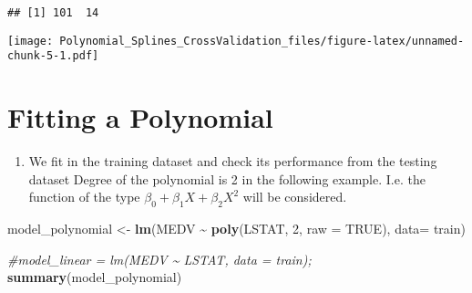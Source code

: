 \documentclass[
]{article}
\newenvironment{Shaded}{\begin{snugshade}}{\end{snugshade}}
\newcommand{\AttributeTok}[1]{\textcolor[rgb]{0.13,0.29,0.53}{#1}}
\newcommand{\CommentTok}[1]{\textcolor[rgb]{0.56,0.35,0.01}{\textit{#1}}}
\newcommand{\ConstantTok}[1]{\textcolor[rgb]{0.56,0.35,0.01}{#1}}
\newcommand{\DecValTok}[1]{\textcolor[rgb]{0.00,0.00,0.81}{#1}}
\newcommand{\FloatTok}[1]{\textcolor[rgb]{0.00,0.00,0.81}{#1}}
\newcommand{\FunctionTok}[1]{\textcolor[rgb]{0.13,0.29,0.53}{\textbf{#1}}}
\newcommand{\NormalTok}[1]{#1}
\newcommand{\OtherTok}[1]{\textcolor[rgb]{0.56,0.35,0.01}{#1}}
\newcommand{\SpecialCharTok}[1]{\textcolor[rgb]{0.81,0.36,0.00}{\textbf{#1}}}
\newcommand{\StringTok}[1]{\textcolor[rgb]{0.31,0.60,0.02}{#1}}
\providecommand{\tightlist}{%
  \setlength{\itemsep}{0pt}\setlength{\parskip}{0pt}}
\begin{document}
\begin{verbatim}
## [1] 101  14
\end{verbatim}

\begin{Shaded}
\end{Shaded}

\texttt{[image: Polynomial\_Splines\_CrossValidation\_files/figure-latex/unnamed-chunk-5-1.pdf]}

\hypertarget{fitting-a-polynomial}{%
\section{Fitting a Polynomial}\label{fitting-a-polynomial}}

\begin{enumerate}
\def\labelenumi{\arabic{enumi})}
\tightlist
\item
  We fit in the training dataset and check its performance from the
  testing dataset Degree of the polynomial is 2 in the following
  example. I.e. the function of the type
  \(\beta_0+\beta_1 X+\beta_2X^2\) will be considered.
\end{enumerate}

\begin{Shaded}
\begin{Highlighting}[]
\NormalTok{model\_polynomial }\OtherTok{\textless{}{-}} \FunctionTok{lm}\NormalTok{(MEDV }\SpecialCharTok{\textasciitilde{}} \FunctionTok{poly}\NormalTok{(LSTAT, }\DecValTok{2}\NormalTok{, }\AttributeTok{raw =} \ConstantTok{TRUE}\NormalTok{), }\AttributeTok{data=}\NormalTok{ train)}


\CommentTok{\#model\_linear = lm(MEDV \textasciitilde{} LSTAT, data = train); }
\FunctionTok{summary}\NormalTok{(model\_polynomial)}
\end{Highlighting}
\end{Shaded}
\end{document}
